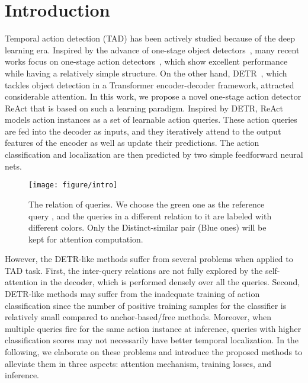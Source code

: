 \documentclass[runningheads]{llncs}
\def\name{ReAct }
\begin{document}
\section{Introduction}
Temporal action detection (TAD) has been actively studied because of the deep learning era. 
Inspired by the advance of one-stage object detectors~\cite{lin2017focal,tian2019fcos,feng2021tood},
many recent works focus on one-stage action detectors~\cite{lin2021learning}, which show excellent performance while having a relatively simple structure. 
On the other hand, DETR~\cite{carion2020end}, which tackles object detection in a Transformer encoder-decoder framework, attracted considerable attention.
In this work, we propose a novel one-stage action detector \name that is based on such a learning paradigm. Inspired by DETR, \name models action instances as a set of learnable action queries. These action queries are fed into the decoder as inputs, and they iteratively attend to the output features of the encoder as well as update their predictions. The action classification and localization are then predicted by two simple feedforward neural nets.

\begin{figure}[t]
    \centering
    \setlength{\abovecaptionskip}{-0.2cm}
    \texttt{[image: figure/intro]}
    \label{intro}
  \caption{The relation of queries. We choose the green one as the reference query , and the queries in a different relation to it are labeled with different colors. Only the Distinct-similar pair (Blue ones) will be kept for attention computation.}
  \vspace{-0.5cm}
\end{figure}


However, the DETR-like methods suffer from several problems when applied to TAD task. 
First, the inter-query relations are not fully explored by the self-attention in the decoder, which is performed densely over all the queries.
Second, DETR-like methods may suffer from the inadequate training of action classification since the number of positive training samples for the classifier is relatively small compared to anchor-based/free methods. Moreover, when multiple queries fire for the same action instance at inference, queries with higher classification scores may not necessarily have better temporal localization.
In the following, we elaborate on these problems and introduce the proposed methods to alleviate them in three aspects: attention mechanism, training losses, and inference.
\end{document}
